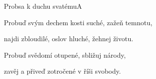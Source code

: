 \begin{song}{Probsa k duchu svatému}{A}{}

\begin{SBVerse}

 

 

\end{SBVerse}

\begin{SBChorus}

 

 

\end{SBChorus}

\begin{SBVerse}

Probuď svým dechem kosti suché, zažeň temnotu,

najdi zbloudilé, oslov hluché, žehnej životu.

\end{SBVerse}

\begin{SBVerse}

Probuď svědomí otupené, sbližuj národy,

zavěj a přiveď zotročené v říši svobody.

\end{SBVerse}

\end{song}
